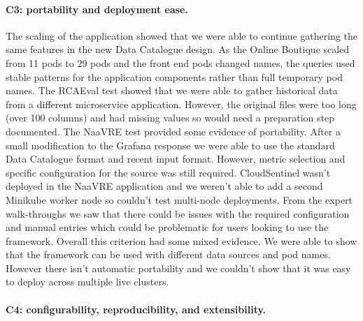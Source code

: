 \paragraph{C3: portability and deployment ease.}

The scaling of the application showed that we were able to continue gathering the same features in the new Data Catalogue design. As the Online Boutique scaled from 11 pods to 29 pods and the front end pods changed names, the queries used stable patterns for the application components rather than full temporary pod names. The RCAEval test showed that we were able to gather historical data from a different microservice application. However, the original files were too long (over 100 columns) and had missing values so would need a preparation step documented. The NaaVRE test provided some evidence of portability. After a small modification to the Grafana response we were able to use the standard Data Catalogue format and recent input format. However, metric selection and specific configuration for the source was still required. CloudSentinel wasn’t deployed in the NaaVRE application and we weren’t able to add a second Minikube worker node so couldn’t test multi-node deployments. From the expert walk-throughs we saw that there could be issues with the required configuration and manual entries which could be problematic for users looking to use the framework. Overall this criterion had some mixed evidence. We were able to show that the framework can be used with different data sources and pod names. However there isn’t automatic portability and we couldn’t show that it was easy to deploy across multiple live clusters.

\paragraph{C4: configurability, reproducibility, and extensibility.}

